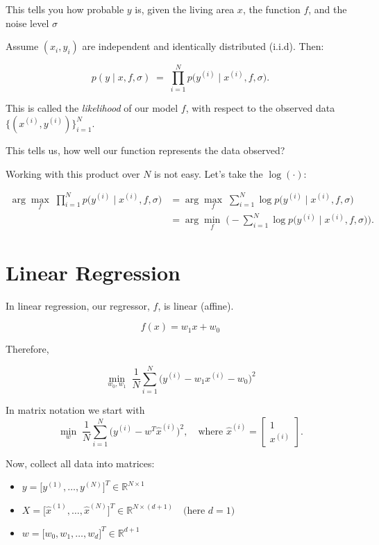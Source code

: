 \documentclass[11pt]{article}
\begin{document}
This tells you how probable $y$ is, given the living area
$x$, the function $f$, and the noise level $\sigma$

\pagebreak

Assume $(x_i, y_i)$ are independent and identically distributed (i.i.d). Then:

\[
	p(y \mid x, f, \sigma)
	\;=\;
	\prod_{i=1}^N p\!\big(y^{(i)} \mid x^{(i)}, f, \sigma\big).
\]

This is called the \emph{likelihood} of our model $f$, with respect to the observed data
\(\{(x^{(i)}, y^{(i)})\}_{i=1}^N\).

This tells us, how well our function represents the data observed?

\medskip

Working with this product over $N$ is not easy. Let’s take
the $\log(\cdot)$:

\begin{align*}
	\arg\max_{f} \; \prod_{i=1}^N p\!\big(y^{(i)} \mid x^{(i)}, f, \sigma\big)
	 & = \arg\max_{f} \; \sum_{i=1}^N \log p\!\big(y^{(i)} \mid x^{(i)}, f, \sigma\big)                \\
	 & = \arg\min_{f} \; \Bigg(- \sum_{i=1}^N \log p\!\big(y^{(i)} \mid x^{(i)}, f, \sigma\big)\Bigg).
\end{align*}


\section*{Linear Regression}
In linear regression, our regressor, $f$, is linear (affine).

\[
	f(x) = w_1x+w_0
\]

Therefore,

\[
	\min_{w_0, w_1} \; \frac{1}{N} \sum_{i=1}^N \Big(y^{(i)} - w_1 x^{(i)} - w_0 \Big)^2
\]


In matrix notation we start with
\[
	\min_{w} \; \frac{1}{N} \sum_{i=1}^N \Big(y^{(i)} - w^T \hat{x}^{(i)}\Big)^2,
	\quad \text{where } \hat{x}^{(i)} = \begin{bmatrix} 1 \\ x^{(i)} \end{bmatrix}.
\]

Now, collect all data into matrices:


\begin{itemize}
	\item $y = \big[y^{(1)}, \ldots, y^{(N)}\big]^T \in \mathbb{R}^{N \times 1}$
	\item $X = \big[\hat{x}^{(1)}, \ldots, \hat{x}^{(N)}\big]^T \in \mathbb{R}^{N \times (d+1)}
		      \quad \text{(here $d = 1$)}$
	\item $w = \big[w_0, w_1, \ldots, w_d\big]^T \in \mathbb{R}^{d+1}$
\end{itemize}
\end{document}
